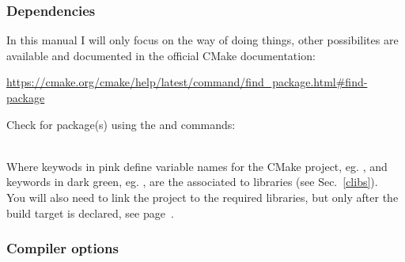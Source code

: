 \subsubsection*{Dependencies}
\label{cmake_deps}

In this manual I will only focus on the  way of doing things, other possibilites are available and documented in the official CMake documentation: 
\begin{center}\href{https://cmake.org/cmake/help/latest/command/find\_package.html\#find-package}{https://cmake.org/cmake/help/latest/command/find\_package.html\#find-package}\end{center}
Check for package(s) using the  and  commands: 
\begin{script}




\end{script}
\\[-0.25cm]
\noindent Where keywods in pink define variable names for the CMake project, eg. \texttt{}, 
and keywords in dark green, eg. , are the associated to  libraries (see Sec.~\ref{clibs}). \\ 
You will also need to link the project to the required libraries, but only after the build target is declared, see page~\pageref{clink}.

\subsubsection*{Compiler options}

